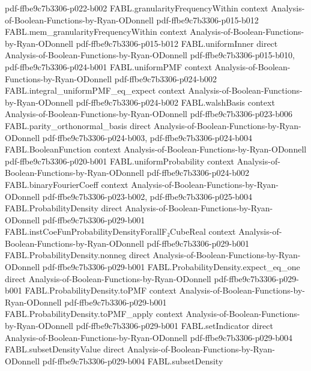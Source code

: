\begin{theorem}
  {pdf-ffbe9c7b3306-p022-b002}
\proofstep
  {FABL.granularityFrequencyWithin}
  {context}
  {Analysis-of-Boolean-Functions-by-Ryan-ODonnell}
  {pdf-ffbe9c7b3306-p015-b012}
\proofstep
  {FABL.mem_granularityFrequencyWithin}
  {context}
  {Analysis-of-Boolean-Functions-by-Ryan-ODonnell}
  {pdf-ffbe9c7b3306-p015-b012}
\proofstep
  {FABL.uniformInner}
  {direct}
  {Analysis-of-Boolean-Functions-by-Ryan-ODonnell}
  {pdf-ffbe9c7b3306-p015-b010,
    pdf-ffbe9c7b3306-p024-b001}
\proofstep
  {FABL.uniformPMF}
  {context}
  {Analysis-of-Boolean-Functions-by-Ryan-ODonnell}
  {pdf-ffbe9c7b3306-p024-b002}
\proofstep
  {FABL.integral_uniformPMF_eq_expect}
  {context}
  {Analysis-of-Boolean-Functions-by-Ryan-ODonnell}
  {pdf-ffbe9c7b3306-p024-b002}
\proofstep
  {FABL.walshBasis}
  {context}
  {Analysis-of-Boolean-Functions-by-Ryan-ODonnell}
  {pdf-ffbe9c7b3306-p023-b006}
\proofstep
  {FABL.parity_orthonormal_basis}
  {direct}
  {Analysis-of-Boolean-Functions-by-Ryan-ODonnell}
  {pdf-ffbe9c7b3306-p024-b003,
    pdf-ffbe9c7b3306-p024-b004}
\proofstep
  {FABL.BooleanFunction}
  {context}
  {Analysis-of-Boolean-Functions-by-Ryan-ODonnell}
  {pdf-ffbe9c7b3306-p020-b001}
\proofstep
  {FABL.uniformProbability}
  {context}
  {Analysis-of-Boolean-Functions-by-Ryan-ODonnell}
  {pdf-ffbe9c7b3306-p024-b002}
\proofstep
  {FABL.binaryFourierCoeff}
  {context}
  {Analysis-of-Boolean-Functions-by-Ryan-ODonnell}
  {pdf-ffbe9c7b3306-p023-b002,
    pdf-ffbe9c7b3306-p025-b004}
\proofstep
  {FABL.ProbabilityDensity}
  {direct}
  {Analysis-of-Boolean-Functions-by-Ryan-ODonnell}
  {pdf-ffbe9c7b3306-p029-b001}
\proofstep
  {FABL.instCoeFunProbabilityDensityForallF₂CubeReal}
  {context}
  {Analysis-of-Boolean-Functions-by-Ryan-ODonnell}
  {pdf-ffbe9c7b3306-p029-b001}
\proofstep
  {FABL.ProbabilityDensity.nonneg}
  {direct}
  {Analysis-of-Boolean-Functions-by-Ryan-ODonnell}
  {pdf-ffbe9c7b3306-p029-b001}
\proofstep
  {FABL.ProbabilityDensity.expect_eq_one}
  {direct}
  {Analysis-of-Boolean-Functions-by-Ryan-ODonnell}
  {pdf-ffbe9c7b3306-p029-b001}
\proofstep
  {FABL.ProbabilityDensity.toPMF}
  {context}
  {Analysis-of-Boolean-Functions-by-Ryan-ODonnell}
  {pdf-ffbe9c7b3306-p029-b001}
\proofstep
  {FABL.ProbabilityDensity.toPMF_apply}
  {context}
  {Analysis-of-Boolean-Functions-by-Ryan-ODonnell}
  {pdf-ffbe9c7b3306-p029-b001}
\proofstep
  {FABL.setIndicator}
  {direct}
  {Analysis-of-Boolean-Functions-by-Ryan-ODonnell}
  {pdf-ffbe9c7b3306-p029-b004}
\proofstep
  {FABL.subsetDensityValue}
  {direct}
  {Analysis-of-Boolean-Functions-by-Ryan-ODonnell}
  {pdf-ffbe9c7b3306-p029-b004}
\proofstep
  {FABL.subsetDensity}

\end{theorem}
